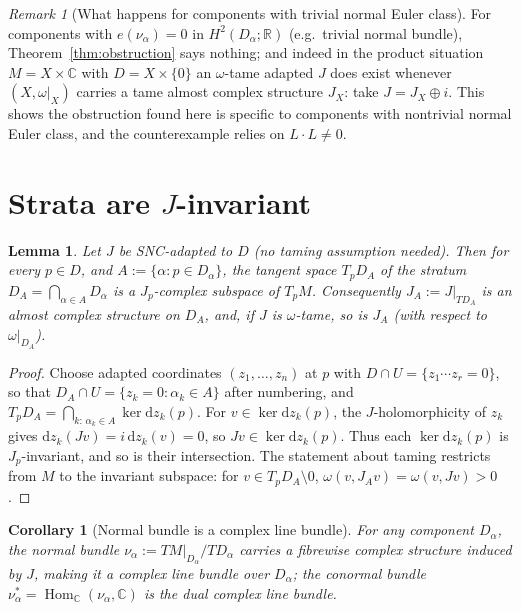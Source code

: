 \documentclass[11pt]{article}
\newtheorem{lemma}[theorem]{Lemma}
\newtheorem{corollary}[theorem]{Corollary}
\theoremstyle{definition}
\theoremstyle{remark}
\newtheorem{remark}[theorem]{Remark}
\newcommand{\CC}{\mathbb{C}}
\newcommand{\RR}{\mathbb{R}}
\newcommand{\Hom}{\operatorname{Hom}}
\newcommand{\dd}{\mathrm{d}}
\begin{document}
\begin{remark}[What happens for components with trivial normal Euler
class]
For components with $e(\nu_\alpha)=0$ in $H^2(D_\alpha;\RR)$ (e.g.\
trivial normal bundle), Theorem~\ref{thm:obstruction} says nothing;
and indeed in the product situation $M=X\times\CC$ with
$D=X\times\{0\}$ an $\omega$-tame adapted $J$ does exist whenever
$(X,\omega|_X)$ carries a tame almost complex structure $J_X$: take
$J=J_X\oplus i$. This shows the obstruction found here is specific
to components with nontrivial normal Euler class, and the
counterexample relies on $L\cdot L\neq0$.
\end{remark}

\section{Strata are $J$-invariant}\label{sec:strata}

\begin{lemma}\label{lem:strata}
Let $J$ be SNC-adapted to $D$ (no taming assumption needed). Then
for every $p\in D$, and $A:=\{\alpha:p\in D_\alpha\}$, the tangent
space $T_pD_A$ of the stratum $D_A=\bigcap_{\alpha\in A}D_\alpha$
is a $J_p$-complex subspace of $T_pM$. Consequently
$J_A:=J|_{TD_A}$ is an almost complex structure on $D_A$, and, if
$J$ is $\omega$-tame, so is $J_A$ (with respect to
$\omega|_{D_A}$).
\end{lemma}

\begin{proof}
Choose adapted coordinates $(z_1,\dots,z_n)$ at $p$ with
$D\cap U=\{z_1\cdots z_r=0\}$, so that $D_A\cap U=\{z_{k}=
0:\alpha_k\in A\}$ after numbering, and
$T_pD_A=\bigcap_{k:\,\alpha_k\in A}\ker\dd z_k(p)$. For
$v\in\ker\dd z_k(p)$, the $J$-holomorphicity of $z_k$ gives
$\dd z_k(Jv)=i\,\dd z_k(v)=0$, so $Jv\in\ker\dd z_k(p)$. Thus each
$\ker\dd z_k(p)$ is $J_p$-invariant, and so is their intersection.
The statement about taming restricts from $M$ to the invariant
subspace: for $v\in T_pD_A\setminus0$,
$\omega(v,J_Av)=\omega(v,Jv)>0$.
\end{proof}

\begin{corollary}[Normal bundle is a complex line bundle]
\label{cor:normal}
For any component $D_\alpha$, the normal bundle
$\nu_\alpha:=TM|_{D_\alpha}/TD_\alpha$ carries a fibrewise complex
structure induced by $J$, making it a complex line bundle over
$D_\alpha$; the conormal bundle $\nu_\alpha^*=\Hom_\CC(\nu_\alpha,
\CC)$ is the dual complex line bundle.
\end{corollary}
\end{document}
